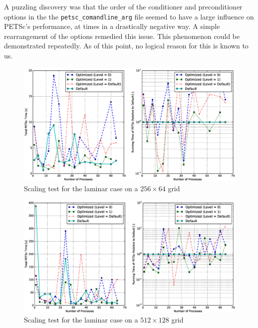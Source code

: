 A puzzling discovery was that the order of the conditioner and preconditioner
options in the the \texttt{petsc\_comandline\_arg} file seemed to have a large
influence on PETSc's performance, at times in a drastically negative way. A
simple rearrangement of the options remedied this issue. This phenomenon could
be demonstrated repeatedly. As of this point, no logical reason for this is
known to us.

\begin{figure}[h]
  \centering
  \includegraphics[width=\textwidth]{FIGURES/petsc-optimization/256x64-laminar.eps}
  \caption{Scaling test for the laminar case on a $256 \times 64$ grid}
  \label{fig:petsc-opt-scaling-laminar-256}
\end{figure}

\begin{figure}[h]
  \centering
  \includegraphics[width=\textwidth]{FIGURES/petsc-optimization/512x128-laminar.eps}
  \caption{Scaling test for the laminar case on a $512 \times 128$ grid}
  \label{fig:petsc-opt-scaling-laminar-512}
\end{figure}

